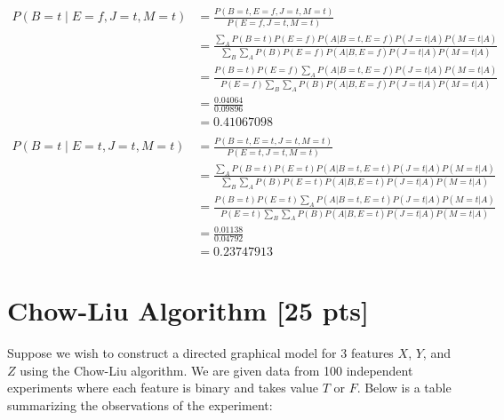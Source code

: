 \documentclass[a4paper]{article}
\theoremstyle{definition}
\newenvironment{soln}{
	\leavevmode\color{blue}\ignorespaces
}{}
\begin{document}
\begin{soln}
	\begin{align*}
		P(B=t \mid E=f,J=t,M=t) & = \frac{P(B=t, E=f, J=t, M=t)}{P(E=f, J=t, M=t)}                                                                      \\
		                        & = \frac{\sum_A P(B=t) P(E=f) P(A|B=t,E=f) P(J=t|A) P(M=t|A) }{\sum_B\sum_A P(B) P(E=f) P(A|B,E=f) P(J=t|A) P(M=t|A) } \\
		                        & = \frac{P(B=t) P(E=f) \sum_A P(A|B=t,E=f) P(J=t|A) P(M=t|A) }{P(E=f) \sum_B\sum_A P(B) P(A|B,E=f) P(J=t|A) P(M=t|A) } \\
		                        & = \frac{0.04064}{0.09896}                                                                                             \\
		                        & = 0.41067098                                                                                                          \\\\
		P(B=t \mid E=t,J=t,M=t) & = \frac{P(B=t, E=t, J=t, M=t)}{P(E=t, J=t, M=t)}                                                                      \\
		                        & = \frac{\sum_A P(B=t) P(E=t) P(A|B=t,E=t) P(J=t|A) P(M=t|A) }{\sum_B\sum_A P(B) P(E=t) P(A|B,E=t) P(J=t|A) P(M=t|A) } \\
		                        & = \frac{P(B=t) P(E=t) \sum_A P(A|B=t,E=t) P(J=t|A) P(M=t|A) }{P(E=t) \sum_B\sum_A P(B) P(A|B,E=t) P(J=t|A) P(M=t|A) } \\
		                        & = \frac{0.01138}{0.04792}                                                                                             \\
		                        & = 0.23747913
	\end{align*}
\end{soln}

\pagebreak


\section{Chow-Liu Algorithm [25 pts]}
Suppose we wish to construct a directed graphical model for 3 features $X$, $Y$, and $Z$ using the Chow-Liu algorithm. We are given data from 100 independent experiments where each feature is binary and takes value $T$ or $F$. Below is a table summarizing the observations of the experiment:
\end{document}

